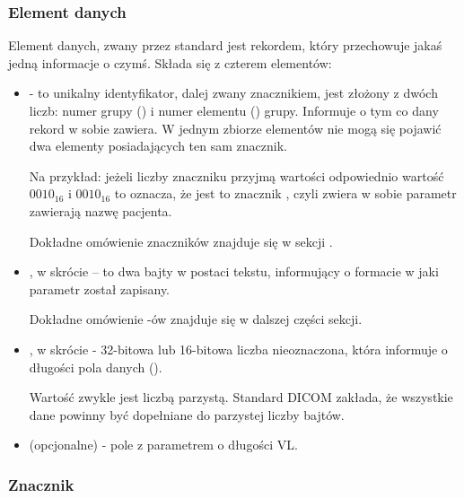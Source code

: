 \subsubsection{Element danych}

Element danych, zwany przez standard \DICOM {} jest rekordem, który przechowuje jakaś jedną informacje o czymś.
Składa się z czterem elementów:

\begin{itemize}

    \item {} - to unikalny identyfikator, dalej zwany znacznikiem, jest złożony z dwóch liczb: numer grupy () i numer elementu () grupy.
          Informuje o tym co dany rekord w sobie zawiera.
          W jednym zbiorze elementów nie mogą się pojawić dwa elementy posiadających ten sam znacznik.

          Na przykład: jeżeli liczby znaczniku przyjmą wartości odpowiednio wartość $0010_{16}$ i $0010_{16}$ to oznacza, że jest to znacznik , czyli zwiera w sobie parametr zawierają nazwę pacjenta.

          Dokładne omówienie znaczników znajduje się w sekcji \label{sec:dicom-tag}.

    \item {}, w skrócie  – to dwa bajty w postaci tekstu, informujący o formacie w jaki parametr został zapisany.

          Dokładne omówienie -ów znajduje się w dalszej części sekcji.

    \item {}, w skrócie  - 32-bitowa lub 16-bitowa liczba nieoznaczona, która informuje o długości pola danych ().

          Wartość  zwykle jest liczbą parzystą.
          Standard DICOM zakłada, że wszystkie dane powinny być dopełniane do parzystej liczby bajtów.

    \item {} (opcjonalne) - pole z parametrem o długości VL.

\end{itemize}

\subsubsection{Znacznik}
\label{sec:dicom-tag}

